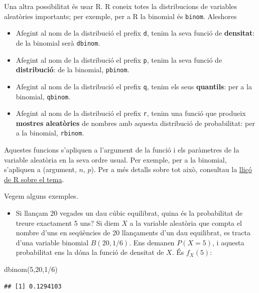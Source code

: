 \documentclass[
]{book}
\newenvironment{Shaded}{\begin{snugshade}}{\end{snugshade}}
\newcommand{\DecValTok}[1]{\textcolor[rgb]{0.00,0.00,0.81}{#1}}
\newcommand{\FunctionTok}[1]{\textcolor[rgb]{0.00,0.00,0.00}{#1}}
\newcommand{\NormalTok}[1]{#1}
\newcommand{\SpecialCharTok}[1]{\textcolor[rgb]{0.00,0.00,0.00}{#1}}
\providecommand{\tightlist}{%
  \setlength{\itemsep}{0pt}\setlength{\parskip}{0pt}}
\theoremstyle{definition}
\theoremstyle{definition}
\theoremstyle{definition}
\theoremstyle{remark}
\begin{document}
Una altra possibilitat és usar R. R coneix totes la distribucions de variables aleatòries importants; per exemple, per a R la binomial és \texttt{binom}. Aleshores

\begin{itemize}
\item
  Afegint al nom de la distribució el prefix \texttt{d}, tenim la seva funció de \textbf{densitat}: de la binomial serà \texttt{dbinom}.
\item
  Afegint al nom de la distribució el prefix \texttt{p}, tenim la seva funció de \textbf{distribució}: de la binomial, \texttt{pbinom}.
\item
  Afegint al nom de la distribució el prefix \texttt{q}, tenim els seus \textbf{quantils}: per a la binomial, \texttt{qbinom}.
\item
  Afegint al nom de la distribució el prefix \texttt{r}, tenim una funció que produeix \textbf{mostres aleatòries} de nombres amb aquesta distribució de probabilitat: per a la binomial, \texttt{rbinom}.
\end{itemize}

Aquestes funcions s'apliquen a l'argument de la funció i els paràmetres de la variable aleatòria en la seva ordre usual. Per exemple, per a la binomial, s'apliquen a (argument, \(n\), \(p\)). Per a més detalls sobre tot això, consultau la \href{https://aprender-uib.github.io/AprendeR1/chap-distr.html}{lliçó de R sobre el tema}.

Vegem alguns exemples.

\begin{itemize}
\tightlist
\item
  Si llançam 20 vegades un dau cúbic equilibrat, quina és la probabilitat de treure exactament 5 uns? Si diem \(X\) a la variable aleatòria que compta el nombre d'uns en seqüències de 20 llançaments d'un dau equilibrat, es tracta d'una variable binomial \(B(20,1/6)\). Ens demanen \(P(X=5)\), i aquesta probabilitat ens la dóna la funció de densitat de \(X\). És \(f_X(5)\):
\end{itemize}

\begin{Shaded}
\begin{Highlighting}[]
\FunctionTok{dbinom}\NormalTok{(}\DecValTok{5}\NormalTok{,}\DecValTok{20}\NormalTok{,}\DecValTok{1}\SpecialCharTok{/}\DecValTok{6}\NormalTok{)}
\end{Highlighting}
\end{Shaded}

\begin{verbatim}
## [1] 0.1294103
\end{verbatim}
\end{document}
